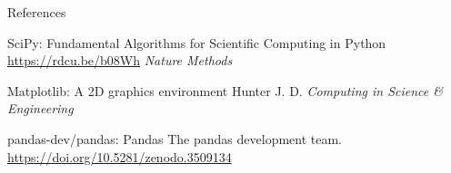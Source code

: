 \begin{frame}[allowframebreaks]{References}
\begin{thebibliography}{}
        SciPy: Fundamental Algorithms for Scientific Computing in Python
        \newblock \url{https://rdcu.be/b08Wh}
        \newblock \emph{Nature Methods}

        Matplotlib: A 2D graphics environment
        \newblock Hunter J. D.
        \newblock \emph{Computing in Science \& Engineering}

        pandas-dev/pandas: Pandas
        \newblock The pandas development team.
        \newblock \url{https://doi.org/10.5281/zenodo.3509134}






    \end{thebibliography}
\end{frame}